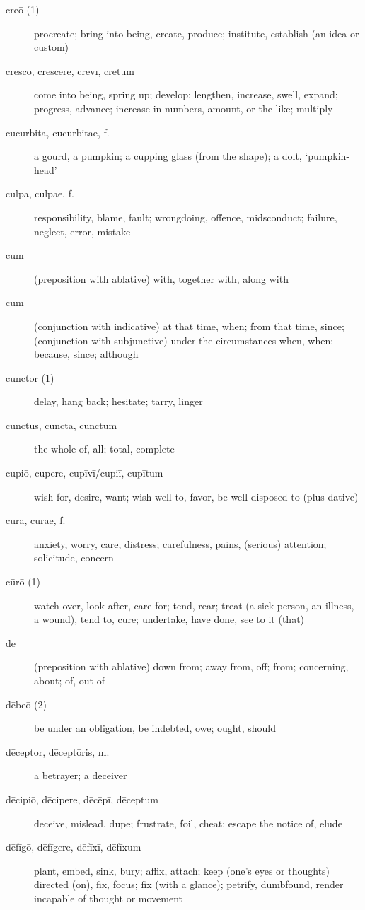 \begin{description}
    \item[creō (1)] \marginnote{*}procreate; bring into being, create, produce; institute, establish (an idea or custom)
    \item[crēscō, crēscere, crēvī, crētum] \marginnote{*}come into being, spring up; develop; lengthen, increase, swell, expand; progress, advance; increase in numbers, amount, or the like; multiply
    \item[cucurbita, cucurbitae, f.] a gourd, a pumpkin; a cupping glass (from the shape); a dolt, `pumpkin-head'
    \item[culpa, culpae, f.] \marginnote{*}responsibility, blame, fault; wrongdoing, offence, midsconduct; failure, neglect, error, mistake
    \item[cum] \marginnote{*}(preposition with ablative) with, together with, along with
    \item[cum] \marginnote{*}(conjunction with indicative) at that time, when; from that time, since; (conjunction with subjunctive) under the circumstances when, when; because, since; although
    \item[cunctor (1)] delay, hang back; hesitate; tarry, linger
    \item[cunctus, cuncta, cunctum] \marginnote{*}the whole of, all; total, complete
    \item[cupiō, cupere, cupīvī/cupiī, cupītum] \marginnote{*}wish for, desire, want; wish well to, favor, be well disposed to (plus dative)
    \item[cūra, cūrae, f.] \marginnote{*}anxiety, worry, care, distress; carefulness, pains, (serious) attention; solicitude, concern
    \item[cūrō (1)] \marginnote{*}watch over, look after, care for; tend, rear; treat (a sick person, an illness, a wound), tend to, cure; undertake, have done, see to it (that)
    \item[dē] \marginnote{*}(preposition with ablative) down from; away from, off; from; concerning, about; of, out of
    \item[dēbeō (2)] \marginnote{*}be under an obligation, be indebted, owe; ought, should
    \item[dēceptor, dēceptōris, m.] a betrayer; a deceiver
    \item[dēcipiō, dēcipere, dēcēpī, dēceptum] deceive, mislead, dupe; frustrate, foil, cheat; escape the notice of, elude
    \item[dēfīgō, dēfīgere, dēfīxī, dēfīxum] plant, embed, sink, bury; affix, attach; keep (one's eyes or thoughts) directed (on), fix, focus; fix (with a glance); petrify, dumbfound, render incapable of thought or movement

\end{description}
